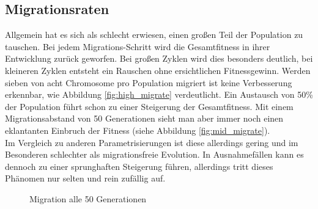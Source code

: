 \documentclass[12pt,a4paper]{article}
\begin{document}
\subsection{Migrationsraten}
Allgemein hat es sich als schlecht erwiesen, einen großen Teil der Population zu tauschen. Bei jedem Migrations-Schritt wird die Gesamtfitness in ihrer Entwicklung zurück geworfen. Bei großen Zyklen wird dies besonders deutlich, bei kleineren Zyklen entsteht ein Rauschen ohne ersichtlichen Fitnessgewinn. Werden sieben von acht Chromosome pro Population migriert ist keine Verbesserung erkennbar, wie Abbildung \ref{fig:high_migrate} verdeutlicht. 
Ein Austausch von 50\% der Population führt schon zu einer Steigerung der Gesamtfitness. Mit einem Migrationsabstand von 50 Generationen sieht man aber immer noch einen eklantanten Einbruch der Fitness (siehe Abbildung \ref{fig:mid_migrate}).\\
Im Vergleich zu anderen Parametrisierungen ist diese allerdings gering und im Besonderen schlechter als migrationsfreie Evolution. In Ausnahmefällen kann es dennoch zu einer sprunghaften Steigerung führen, allerdings tritt dieses Phänomen nur selten und rein zufällig auf.
\begin{figure}
\centering
	 \caption{Migration alle 50 Generationen}
\end{figure}
\end{document}
